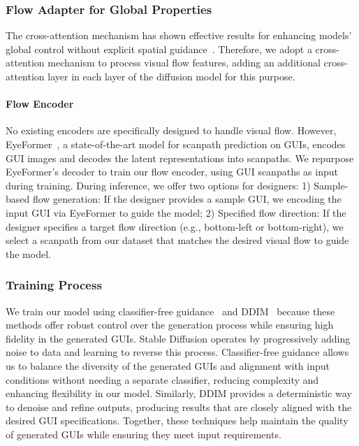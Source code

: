 \subsubsection{Flow Adapter for Global Properties}

The cross-attention mechanism has shown effective results for enhancing models' global control without explicit spatial guidance~\cite{ye2023ip, zhao2024uni}. Therefore, we adopt a cross-attention mechanism to process visual flow features, adding an additional cross-attention layer in each layer of the diffusion model for this purpose.


\paragraph{Flow Encoder}

No existing encoders are specifically designed to handle visual flow. However, EyeFormer~\cite{eyeformer}, a state-of-the-art model for scanpath prediction on GUIs, encodes GUI images and decodes the latent representations into scanpaths. We repurpose EyeFormer’s decoder to train our flow encoder, using GUI scanpaths as input during training. During inference, we offer two options for designers:
1) Sample-based flow generation: If the designer provides a sample GUI, we encoding the input GUI via EyeFormer to guide the model;
2) Specified flow direction: If the designer specifies a target flow direction (e.g., bottom-left or bottom-right), we select a scanpath from our dataset that matches the desired visual flow to guide the model.


\subsubsection{Training Process}


We train our model using classifier-free guidance~\cite{cfg} and DDIM~\cite{song2020denoising} because these methods offer robust control over the generation process while ensuring high fidelity in the generated GUIs. Stable Diffusion operates by progressively adding noise to data and learning to reverse this process. Classifier-free guidance allows us to balance the diversity of the generated GUIs and alignment with input conditions without needing a separate classifier, reducing complexity and enhancing flexibility in our model. Similarly, DDIM provides a deterministic way to denoise and refine outputs, producing results that are closely aligned with the desired GUI specifications. Together, these techniques help maintain the quality of generated GUIs while ensuring they meet input requirements. 

